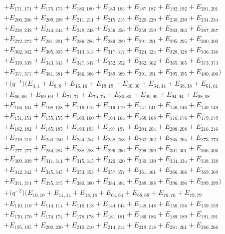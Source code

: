 \documentclass[10pt,a4paper]{amsart}
\numberwithin{equation}{section}
\theoremstyle{definition}
\begin{document}
\begin{align*}
&+E_{171,171}+E_{175,175}+E_{180,180}+E_{183,183}+E_{187,187}+E_{192,192}+E_{201,201}\\
&+E_{206,206}+E_{209,209}+E_{211,211}+E_{215,215}+E_{220,220}+E_{230,230}+E_{234,234}\\
&+E_{238,238}+E_{244,244}+E_{248,248}+E_{256,256}+E_{259,259}+E_{263,263}+E_{267,267}\\
&+E_{272,272}+E_{281,281}+E_{286,286}+E_{289,289}+E_{291,291}+E_{295,295}+E_{300,300}\\
&+E_{302,302}+E_{305,305}+E_{313,313}+E_{317,317}+E_{324,324}+E_{328,328}+E_{336,336}\\
&+E_{339,339}+E_{343,343}+E_{347,347}+E_{352,352}+E_{362,362}+E_{365,365}+E_{373,373}\\
&+E_{377,377}+E_{381,381}+E_{386,386}+E_{389,389}+E_{391,391}+E_{395,395}+E_{400,400})\\
&+\bigl(q^{-1}\bigr)(E_{4,4}+E_{8,8}+E_{16,16}+E_{19,19}+E_{30,30}+E_{34,34}+E_{38,38}+E_{61,61}\\
&+E_{66,66}+E_{69,69}+E_{71,71}+E_{75,75}+E_{80,80}+E_{90,90}+E_{94,94}+E_{98,98}\\
&+E_{104,104}+E_{108,108}+E_{116,116}+E_{119,119}+E_{141,141}+E_{146,146}+E_{149,149}\\
&+E_{151,151}+E_{155,155}+E_{160,160}+E_{164,164}+E_{168,168}+E_{176,176}+E_{179,179}\\
&+E_{182,182}+E_{185,185}+E_{193,193}+E_{197,197}+E_{204,204}+E_{208,208}+E_{216,216}\\
&+E_{219,219}+E_{250,250}+E_{254,254}+E_{258,258}+E_{262,262}+E_{265,265}+E_{273,273}\\
&+E_{277,277}+E_{284,284}+E_{288,288}+E_{296,296}+E_{299,299}+E_{301,301}+E_{306,306}\\
&+E_{309,309}+E_{311,311}+E_{315,315}+E_{320,320}+E_{330,330}+E_{334,334}+E_{338,338}\\
&+E_{342,342}+E_{345,345}+E_{353,353}+E_{357,357}+E_{361,361}+E_{366,366}+E_{369,369}\\
&+E_{371,371}+E_{375,375}+E_{380,380}+E_{384,384}+E_{388,388}
+E_{396,396}+E_{399,399})\\
&+\bigl(q^{-2}\bigr)(E_{10,10}+E_{14,14}+E_{18,18}+E_{64,64}+E_{68,68}+E_{76,76}+E_{79,79}\\
&+E_{110,110}+E_{114,114}+E_{118,118}+E_{144,144}+E_{148,148}+E_{156,156}+E_{159,159}\\
&+E_{170,170}+E_{174,174}+E_{178,178}+E_{181,181}+E_{186,186}+E_{189,189}+E_{191,191}\\
&+E_{195,195}+E_{200,200}+E_{210,210}+E_{214,214}+E_{218,218}+E_{261,261}+E_{266,266}\\

\end{align*}
\end{document}
